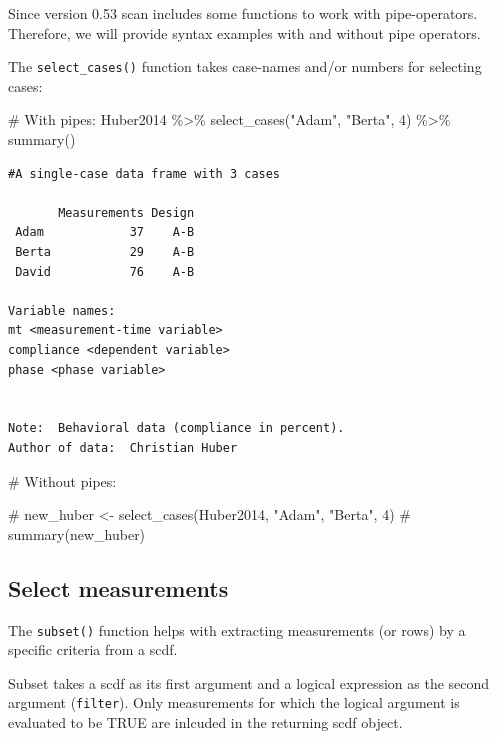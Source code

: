\documentclass[
  letterpaper,
  DIV=11,
  numbers=noendperiod]{scrreprt}
\newenvironment{Shaded}{\begin{snugshade}}{\end{snugshade}}
\newcommand{\CommentTok}[1]{\textcolor[rgb]{0.37,0.37,0.37}{#1}}
\newcommand{\DecValTok}[1]{\textcolor[rgb]{0.68,0.00,0.00}{#1}}
\newcommand{\FunctionTok}[1]{\textcolor[rgb]{0.28,0.35,0.67}{#1}}
\newcommand{\NormalTok}[1]{\textcolor[rgb]{0.00,0.23,0.31}{#1}}
\newcommand{\SpecialCharTok}[1]{\textcolor[rgb]{0.37,0.37,0.37}{#1}}
\newcommand{\StringTok}[1]{\textcolor[rgb]{0.13,0.47,0.30}{#1}}
\begin{document}
Since version 0.53 scan includes some functions to work with
pipe-operators. Therefore, we will provide syntax examples with and
without pipe operators.

The \texttt{select\_cases()} function takes case-names and/or numbers
for selecting cases:

\begin{Shaded}
\begin{Highlighting}[]
\CommentTok{\# With pipes:}
\NormalTok{Huber2014 }\SpecialCharTok{\%\textgreater{}\%}
  \FunctionTok{select\_cases}\NormalTok{(}\StringTok{"Adam"}\NormalTok{, }\StringTok{"Berta"}\NormalTok{, }\DecValTok{4}\NormalTok{) }\SpecialCharTok{\%\textgreater{}\%}
  \FunctionTok{summary}\NormalTok{()}
\end{Highlighting}
\end{Shaded}

\begin{verbatim}
#A single-case data frame with 3 cases

       Measurements Design
 Adam            37    A-B
 Berta           29    A-B
 David           76    A-B

Variable names:
mt <measurement-time variable>
compliance <dependent variable>
phase <phase variable>


Note:  Behavioral data (compliance in percent).
Author of data:  Christian Huber 
\end{verbatim}

\begin{Shaded}
\begin{Highlighting}[]
\CommentTok{\# Without pipes:}

\CommentTok{\# new\_huber \textless{}{-} select\_cases(Huber2014, "Adam", "Berta", 4)}
\CommentTok{\# summary(new\_huber)}
\end{Highlighting}
\end{Shaded}

\hypertarget{sec-subset}{%
\subsection{Select measurements}\label{sec-subset}}

The \texttt{subset()} function helps with extracting measurements (or
rows) by a specific criteria from a scdf.

Subset takes a scdf as its first argument and a logical expression as
the second argument (\texttt{filter}). Only measurements for which the
logical argument is evaluated to be TRUE are inlcuded in the returning
scdf object.
\end{document}
